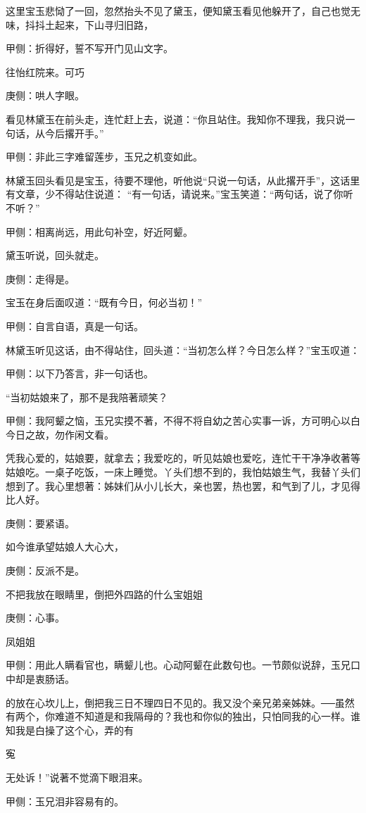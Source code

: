 \begin{parag}
    这里宝玉悲恸了一回，忽然抬头不见了黛玉，便知黛玉看见他躲开了，自己也觉无味，抖抖土起来，下山寻归旧路，\begin{note}甲侧：折得好，誓不写开门见山文字。\end{note}往怡红院来。可巧\begin{note}庚侧：哄人字眼。\end{note}看见林黛玉在前头走，连忙赶上去，说道：“你且站住。我知你不理我，我只说一句话，从今后撂开手。”\begin{note}甲侧：非此三字难留莲步，玉兄之机变如此。\end{note}林黛玉回头看见是宝玉，待要不理他，听他说“只说一句话，从此撂开手”，这话里有文章，少不得站住说道： “有一句话，请说来。”宝玉笑道：“两句话，说了你听不听？”\begin{note}甲侧：相离尚远，用此句补空，好近阿颦。\end{note}黛玉听说，回头就走。\begin{note}庚侧：走得是。\end{note}宝玉在身后面叹道：“既有今日，何必当初！”\begin{note}甲侧：自言自语，真是一句话。\end{note}林黛玉听见这话，由不得站住，回头道：“当初怎么样？今日怎么样？”宝玉叹道：\begin{note}甲侧：以下乃答言，非一句话也。\end{note}“当初姑娘来了，那不是我陪著顽笑？\begin{note}甲侧：我阿颦之恼，玉兄实摸不著，不得不将自幼之苦心实事一诉，方可明心以白今日之故，勿作闲文看。\end{note}凭我心爱的，姑娘要，就拿去；我爱吃的，听见姑娘也爱吃，连忙干干净净收著等姑娘吃。一桌子吃饭，一床上睡觉。丫头们想不到的，我怕姑娘生气，我替丫头们想到了。我心里想著：姊妹们从小儿长大，亲也罢，热也罢，和气到了儿，才见得比人好。\begin{note}庚侧：要紧语。\end{note}如今谁承望姑娘人大心大，\begin{note}庚侧：反派不是。\end{note}不把我放在眼睛里，倒把外四路的什么宝姐姐\begin{note}庚侧：心事。\end{note}凤姐姐\begin{note}甲侧：用此人瞒看官也，瞒颦儿也。心动阿颦在此数句也。一节颇似说辞，玉兄口中却是衷肠话。\end{note}的放在心坎儿上，倒把我三日不理四日不见的。我又没个亲兄弟亲姊妹。──虽然有两个，你难道不知道是和我隔母的？我也和你似的独出，只怕同我的心一样。谁知我是白操了这个心，弄的有\begin{note}寃\end{note}无处诉！”说著不觉滴下眼泪来。\begin{note}甲侧：玉兄泪非容易有的。\end{note}
\end{parag}


